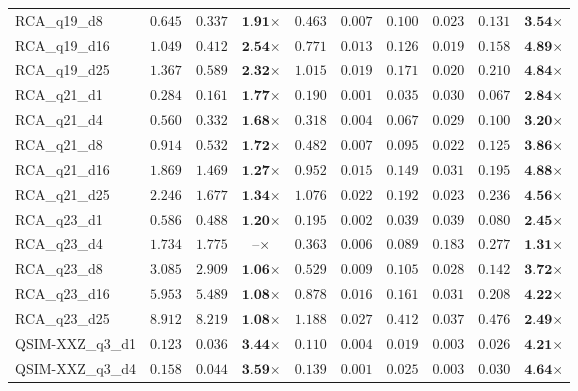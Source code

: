 \begin{table*}[t]
{\begin{tabular}{| l || r r c || r r r r r c |}
RCA\_q19\_d8 & $0.645$ & $0.337$ & $\textbf{1.91}$$\times$ & $0.463$ & $0.007$ & $0.100$ & $0.023$ & $0.131$ & $\textbf{3.54}$$\times$ \\
RCA\_q19\_d16 & $1.049$ & $0.412$ & $\textbf{2.54}$$\times$ & $0.771$ & $0.013$ & $0.126$ & $0.019$ & $0.158$ & $\textbf{4.89}$$\times$ \\
RCA\_q19\_d25 & $1.367$ & $0.589$ & $\textbf{2.32}$$\times$ & $1.015$ & $0.019$ & $0.171$ & $0.020$ & $0.210$ & $\textbf{4.84}$$\times$ \\
RCA\_q21\_d1 & $0.284$ & $0.161$ & $\textbf{1.77}$$\times$ & $0.190$ & $0.001$ & $0.035$ & $0.030$ & $0.067$ & $\textbf{2.84}$$\times$ \\
RCA\_q21\_d4 & $0.560$ & $0.332$ & $\textbf{1.68}$$\times$ & $0.318$ & $0.004$ & $0.067$ & $0.029$ & $0.100$ & $\textbf{3.20}$$\times$ \\
RCA\_q21\_d8 & $0.914$ & $0.532$ & $\textbf{1.72}$$\times$ & $0.482$ & $0.007$ & $0.095$ & $0.022$ & $0.125$ & $\textbf{3.86}$$\times$ \\
RCA\_q21\_d16 & $1.869$ & $1.469$ & $\textbf{1.27}$$\times$ & $0.952$ & $0.015$ & $0.149$ & $0.031$ & $0.195$ & $\textbf{4.88}$$\times$ \\
RCA\_q21\_d25 & $2.246$ & $1.677$ & $\textbf{1.34}$$\times$ & $1.076$ & $0.022$ & $0.192$ & $0.023$ & $0.236$ & $\textbf{4.56}$$\times$ \\
RCA\_q23\_d1 & $0.586$ & $0.488$ & $\textbf{1.20}$$\times$ & $0.195$ & $0.002$ & $0.039$ & $0.039$ & $0.080$ & $\textbf{2.45}$$\times$ \\
RCA\_q23\_d4 & $1.734$ & $1.775$ & $\textbf{--}$$\times$ & $0.363$ & $0.006$ & $0.089$ & $0.183$ & $0.277$ & $\textbf{1.31}$$\times$ \\
RCA\_q23\_d8 & $3.085$ & $2.909$ & $\textbf{1.06}$$\times$ & $0.529$ & $0.009$ & $0.105$ & $0.028$ & $0.142$ & $\textbf{3.72}$$\times$ \\
RCA\_q23\_d16 & $5.953$ & $5.489$ & $\textbf{1.08}$$\times$ & $0.878$ & $0.016$ & $0.161$ & $0.031$ & $0.208$ & $\textbf{4.22}$$\times$ \\
RCA\_q23\_d25 & $8.912$ & $8.219$ & $\textbf{1.08}$$\times$ & $1.188$ & $0.027$ & $0.412$ & $0.037$ & $0.476$ & $\textbf{2.49}$$\times$ \\
QSIM-XXZ\_q3\_d1 & $0.123$ & $0.036$ & $\textbf{3.44}$$\times$ & $0.110$ & $0.004$ & $0.019$ & $0.003$ & $0.026$ & $\textbf{4.21}$$\times$ \\
QSIM-XXZ\_q3\_d4 & $0.158$ & $0.044$ & $\textbf{3.59}$$\times$ & $0.139$ & $0.001$ & $0.025$ & $0.003$ & $0.030$ & $\textbf{4.64}$$\times$ \\

\end{tabular}}
\end{table*}
